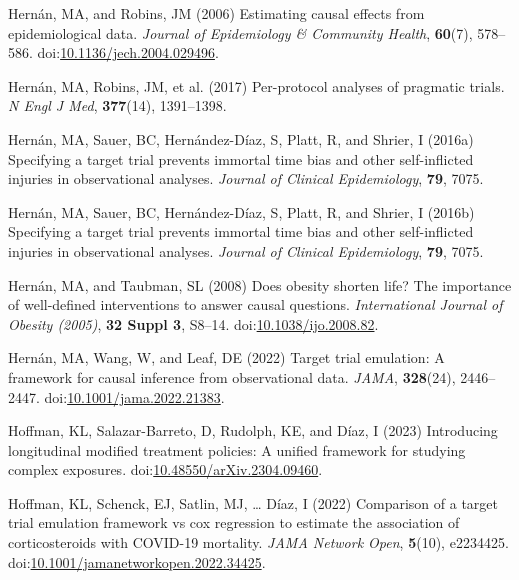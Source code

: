 \documentclass[
  singlecolumn]{article}
\newlength{\cslhangindent}
\newenvironment{CSLReferences}[2] %
 {\begin{list}{}{%
  \setlength{\itemindent}{0pt}
  \setlength{\leftmargin}{0pt}
  \setlength{\parsep}{0pt}
  \ifodd #1
   \setlength{\leftmargin}{\cslhangindent}
   \setlength{\itemindent}{-1\cslhangindent}
  \fi
  \setlength{\itemsep}{#2\baselineskip}}}
 {\end{list}}
\begin{document}
\begin{CSLReferences}{1}{0}
Hernán, MA, and Robins, JM (2006) Estimating causal effects from
epidemiological data. \emph{Journal of Epidemiology \& Community
Health}, \textbf{60}(7), 578--586.
doi:\href{https://doi.org/10.1136/jech.2004.029496}{10.1136/jech.2004.029496}.

Hernán, MA, Robins, JM, et al. (2017) Per-protocol analyses of pragmatic
trials. \emph{N Engl J Med}, \textbf{377}(14), 1391--1398.

Hernán, MA, Sauer, BC, Hernández-Díaz, S, Platt, R, and Shrier, I
(2016a) Specifying a target trial prevents immortal time bias and other
self-inflicted injuries in observational analyses. \emph{Journal of
Clinical Epidemiology}, \textbf{79}, 7075.

Hernán, MA, Sauer, BC, Hernández-Díaz, S, Platt, R, and Shrier, I
(2016b) Specifying a target trial prevents immortal time bias and other
self-inflicted injuries in observational analyses. \emph{Journal of
Clinical Epidemiology}, \textbf{79}, 7075.

Hernán, MA, and Taubman, SL (2008) Does obesity shorten life? The
importance of well-defined interventions to answer causal questions.
\emph{International Journal of Obesity (2005)}, \textbf{32 Suppl 3},
S8--14.
doi:\href{https://doi.org/10.1038/ijo.2008.82}{10.1038/ijo.2008.82}.

Hernán, MA, Wang, W, and Leaf, DE (2022) Target trial emulation: A
framework for causal inference from observational data. \emph{JAMA},
\textbf{328}(24), 2446--2447.
doi:\href{https://doi.org/10.1001/jama.2022.21383}{10.1001/jama.2022.21383}.

Hoffman, KL, Salazar-Barreto, D, Rudolph, KE, and Díaz, I (2023)
Introducing longitudinal modified treatment policies: A unified
framework for studying complex exposures.
doi:\href{https://doi.org/10.48550/arXiv.2304.09460}{10.48550/arXiv.2304.09460}.

Hoffman, KL, Schenck, EJ, Satlin, MJ, \ldots{} Díaz, I (2022) Comparison
of a target trial emulation framework vs cox regression to estimate the
association of corticosteroids with COVID-19 mortality. \emph{JAMA
Network Open}, \textbf{5}(10), e2234425.
doi:\href{https://doi.org/10.1001/jamanetworkopen.2022.34425}{10.1001/jamanetworkopen.2022.34425}.


\end{CSLReferences}
\end{document}
